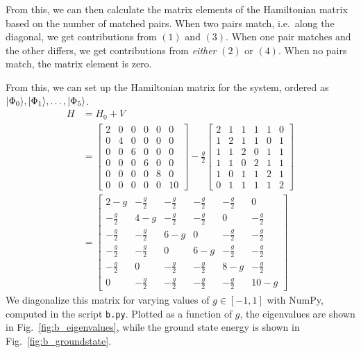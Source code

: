 From this, we can then calculate the matrix elements of the Hamiltonian matrix based on the number of matched pairs.
When two pairs match, i.e.~along the diagonal, we get contributions from $(1)$ and $(3)$.
When one pair matches and the other differs, we get contributions from \textit{either} $(2)$ or $(4)$.
When no pairs match, the matrix element is zero.

From this, we can set up the Hamiltonian matrix for the system, ordered as $\lvert\Phi_0\rangle, \lvert\Phi_1\rangle, \ldots, \lvert\Phi_5\rangle$.
\begin{align*}
    H &= H_0 + V \\
    &=
    \begin{bmatrix}
        2 & 0 & 0 & 0 & 0 & 0 \\
        0 & 4 & 0 & 0 & 0 & 0 \\
        0 & 0 & 6 & 0 & 0 & 0 \\
        0 & 0 & 0 & 6 & 0 & 0 \\
        0 & 0 & 0 & 0 & 8 & 0 \\
        0 & 0 & 0 & 0 & 0 & 10
    \end{bmatrix}
    - \frac{g}{2}
    \begin{bmatrix}
        2 & 1 & 1 & 1 & 1 & 0 \\
        1 & 2 & 1 & 1 & 0 & 1 \\
        1 & 1 & 2 & 0 & 1 & 1 \\
        1 & 1 & 0 & 2 & 1 & 1 \\
        1 & 0 & 1 & 1 & 2 & 1 \\
        0 & 1 & 1 & 1 & 1 & 2
    \end{bmatrix} \\
    &=
    \begin{bmatrix}
        2 - g & - \frac{g}{2} & - \frac{g}{2} & - \frac{g}{2} & - \frac{g}{2} & 0 \\
        - \frac{g}{2} & 4 - g & - \frac{g}{2} & - \frac{g}{2} & 0 & - \frac{g}{2} \\
        - \frac{g}{2} & - \frac{g}{2} & 6 - g & 0 & - \frac{g}{2} & - \frac{g}{2} \\
        - \frac{g}{2} & - \frac{g}{2} & 0 & 6 - g & - \frac{g}{2} & - \frac{g}{2} \\
        - \frac{g}{2} & 0 & - \frac{g}{2} & - \frac{g}{2} & 8 - g & - \frac{g}{2} \\
        0 & - \frac{g}{2} & - \frac{g}{2} & - \frac{g}{2} & - \frac{g}{2} & 10 - g
    \end{bmatrix}
\end{align*}
We diagonalize this matrix for varying values of $g \in [-1, 1]$ with NumPy, computed in the script \verb|b.py|.
Plotted as a function of $g$, the eigenvalues are shown in Fig.~\ref{fig:b_eigenvalues}, while the ground state energy is shown in Fig.~\ref{fig:b_groundstate}.

